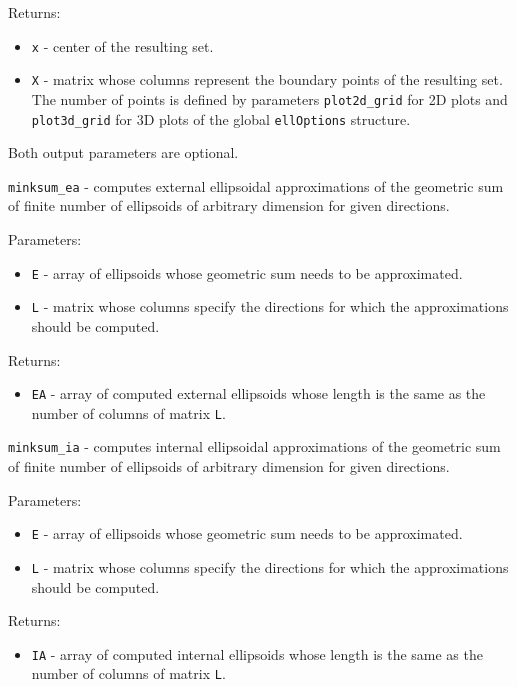 \documentclass{report}
\begin{document}
Returns:
\begin{itemize}
\item {\tt x} - center of the resulting set.
\item {\tt X} - matrix whose columns represent the boundary points of the
resulting set. The number of points is defined by parameters
{\tt plot2d\_grid} for 2D plots and {\tt plot3d\_grid} for 3D plots of the
global {\tt ellOptions} structure.
\end{itemize}
Both output parameters are optional.

\newpage

{\Large {\tt minksum\_ea}} - computes external ellipsoidal approximations
of the geometric sum of finite number of ellipsoids of arbitrary dimension
for given directions.

Parameters:
\begin{itemize}
\item {\tt E} - array of ellipsoids whose geometric sum needs to be
approximated.
\item {\tt L} - matrix whose columns specify the directions for which
the approximations should be computed.
\end{itemize}

Returns:
\begin{itemize}
\item {\tt EA} - array of computed external ellipsoids whose length is the same
as the number of columns of matrix {\tt L}.
\end{itemize}



\newpage

{\Large {\tt minksum\_ia}} - computes internal ellipsoidal approximations
of the geometric sum of finite number of ellipsoids of arbitrary dimension
for given directions.

Parameters:
\begin{itemize}
\item {\tt E} - array of ellipsoids whose geometric sum needs to be
approximated.
\item {\tt L} - matrix whose columns specify the directions for which
the approximations should be computed.
\end{itemize}

Returns:
\begin{itemize}
\item {\tt IA} - array of computed internal ellipsoids whose length is the same
as the number of columns of matrix {\tt L}.
\end{itemize}
\end{document}
